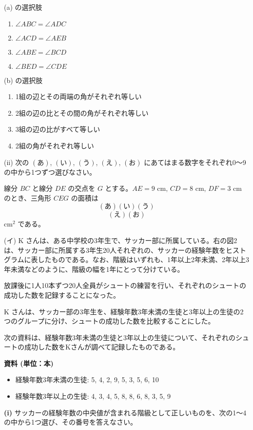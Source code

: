 \documentclass{ltjsarticle}
\begin{document}
(a) の選択肢
\begin{enumerate}
    \item $\angle ABC = \angle ADC$
    \item $\angle ACD = \angle AEB$
    \item $\angle ABE = \angle BCD$
    \item $\angle BED = \angle CDE$
\end{enumerate}

(b) の選択肢
\begin{enumerate}
    \item 1組の辺とその両端の角がそれぞれ等しい
    \item 2組の辺の比とその間の角がそれぞれ等しい
    \item 3組の辺の比がすべて等しい
    \item 2組の角がそれぞれ等しい
\end{enumerate}

(ii) 次の $\mathbf{(あ)}$, $\mathbf{(い)}$, $\mathbf{(う)}$, $\mathbf{(え)}$, $\mathbf{(お)}$ にあてはまる数字をそれぞれ0～9の中から1つずつ選びなさい。

線分 $BC$ と線分 $DE$ の交点を $G$ とする。$AE=9$ cm, $CD=8$ cm, $DF=3$ cm のとき、三角形 $CEG$ の面積は
\[ \mathbf{(あ)} \mathbf{(い)} \mathbf{(う)} \]
\[ \mathbf{(え)} \mathbf{(お)} \] cm$^2$ である。

(イ) K さんは、ある中学校の3年生で、サッカー部に所属している。右の図2は、サッカー部に所属する3年生20人それぞれの、サッカーの経験年数をヒストグラムに表したものである。なお、階級はいずれも、1年以上2年未満、2年以上3年未満などのように、階級の幅を1年にとって分けている。

 放課後に1人10本ずつ20人全員がシュートの練習を行い、それぞれのシュートの成功した数を記録することになった。

 K さんは、サッカー部の3年生を、経験年数3年未満の生徒と3年以上の生徒の2つのグループに分け、シュートの成功した数を比較することにした。

 次の資料は、経験年数3年未満の生徒と3年以上の生徒について、それぞれのシュートの成功した数をKさんが調べて記録したものである。

\textbf{資料 (単位：本)}
\begin{itemize}
    \item 経験年数3年未満の生徒: 5, 4, 2, 9, 5, 3, 5, 6, 10
    \item 経験年数3年以上の生徒: 4, 3, 4, 5, 8, 8, 6, 8, 3, 5, 9
\end{itemize}

\textbf{(i)}
サッカーの経験年数の中央値が含まれる階級として正しいものを、次の1～4の中から1つ選び、その番号を答えなさい。
\end{document}
